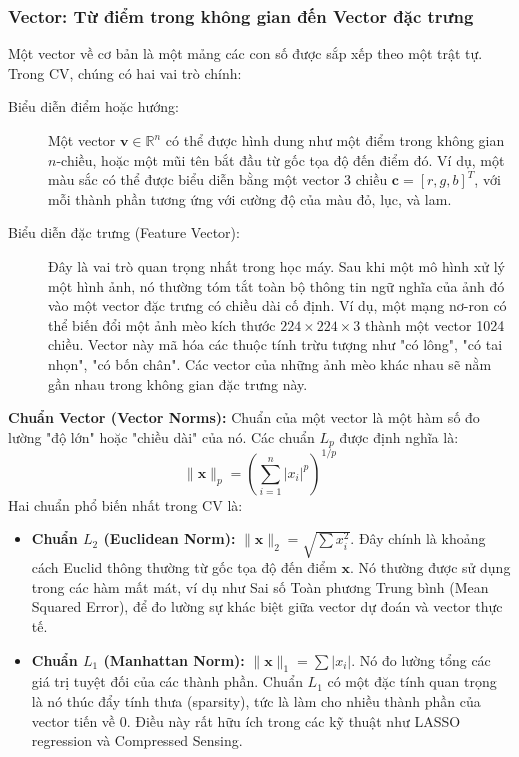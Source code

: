 \subsubsection{Vector: Từ điểm trong không gian đến Vector đặc trưng}
Một vector về cơ bản là một mảng các con số được sắp xếp theo một trật tự. Trong CV, chúng có hai vai trò chính:
\begin{description}
    \item[Biểu diễn điểm hoặc hướng:] Một vector $\mathbf{v} \in \mathbb{R}^n$ có thể được hình dung như một điểm trong không gian $n$-chiều, hoặc một mũi tên bắt đầu từ gốc tọa độ đến điểm đó. Ví dụ, một màu sắc có thể được biểu diễn bằng một vector 3 chiều $\mathbf{c} = [r, g, b]^T$, với mỗi thành phần tương ứng với cường độ của màu đỏ, lục, và lam.
    \item[Biểu diễn đặc trưng (Feature Vector):] Đây là vai trò quan trọng nhất trong học máy. Sau khi một mô hình xử lý một hình ảnh, nó thường tóm tắt toàn bộ thông tin ngữ nghĩa của ảnh đó vào một vector đặc trưng có chiều dài cố định. Ví dụ, một mạng nơ-ron có thể biến đổi một ảnh mèo kích thước $224 \times 224 \times 3$ thành một vector 1024 chiều. Vector này mã hóa các thuộc tính trừu tượng như "có lông", "có tai nhọn", "có bốn chân". Các vector của những ảnh mèo khác nhau sẽ nằm gần nhau trong không gian đặc trưng này.
\end{description}

\textbf{Chuẩn Vector (Vector Norms):} Chuẩn của một vector là một hàm số đo lường "độ lớn" hoặc "chiều dài" của nó. Các chuẩn $L_p$ được định nghĩa là:
\begin{equation}
    \|\mathbf{x}\|_p = \left( \sum_{i=1}^{n} |x_i|^p \right)^{1/p}
\end{equation}
Hai chuẩn phổ biến nhất trong CV là:
\begin{itemize}
    \item \textbf{Chuẩn $L_2$ (Euclidean Norm):} $\|\mathbf{x}\|_2 = \sqrt{\sum x_i^2}$. Đây chính là khoảng cách Euclid thông thường từ gốc tọa độ đến điểm $\mathbf{x}$. Nó thường được sử dụng trong các hàm mất mát, ví dụ như Sai số Toàn phương Trung bình (Mean Squared Error), để đo lường sự khác biệt giữa vector dự đoán và vector thực tế.
    \item \textbf{Chuẩn $L_1$ (Manhattan Norm):} $\|\mathbf{x}\|_1 = \sum |x_i|$. Nó đo lường tổng các giá trị tuyệt đối của các thành phần. Chuẩn $L_1$ có một đặc tính quan trọng là nó thúc đẩy tính thưa (sparsity), tức là làm cho nhiều thành phần của vector tiến về 0. Điều này rất hữu ích trong các kỹ thuật như LASSO regression và Compressed Sensing.
\end{itemize}

